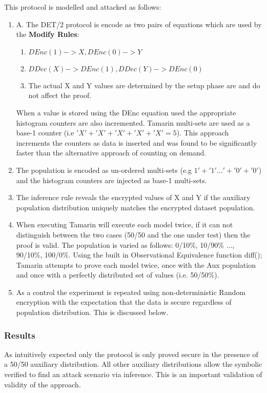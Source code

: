 \documentclass[journal]{IEEEtran}
\begin{document}
This protocol is modelled and attacked as follows:
\begin{enumerate}[label=(\Alph*)]
        \item A. The DET/2 protocol is encode as two pairs of equations which are used by the \textbf{Modify Rules}:
    \begin{enumerate}
        \item 	$DEnc(1) -> X,	DEnc(0) -> Y$
    	\item 	$DDec(X) ->  DEnc(1), DDec(Y) ->  DEnc(0)$
        \item       The actual X and Y values are determined by the setup phase are and do not affect the proof.
    \end{enumerate}
	When a value is stored using the DEnc equation used the appropriate histogram counters are also incremented. Tamarin multi-sets are used as a base-1 counter (i.e $'X'+'X'+'X'+'X'+'X' = 5$).  This approach increments the counters as data is inserted and was found to be significantly faster than the alternative approach of counting on demand.
\item The \aux{} population is encoded as un-ordered multi-sets (e.g $ 1' + '1' ... ' + '0' + '0'$) and the \aux{} histogram counters are injected as base-1 multi-sets.
\item The inference rule reveals the encrypted values of X and Y if the auxiliary population distribution uniquely matches the encrypted dataset population.
\item When executing Tamarin will execute each model twice, if it can not distinguish between the two cases (50/50 and the one under test) then the proof is valid. The population is varied as follows: 0/10\%, 10/90\% ..., 90/10\%, 100/0\%. 
Using the built in Observational Equivalence function diff(); Tamarin attempts to prove each model twice, once with the Aux population and once with a perfectly distributed set of values (i.e. 50/50\%). 
\item As a control the experiment is repeated using non-deterministic Random encryption with the expectation that the data is secure regardless of population distribution. This is discussed below.
\end{enumerate}
\subsubsection{Results} As intuitively expected only the protocol is only proved secure in the presence of a 50/50 auxiliary distribution. All other auxiliary distributions allow the symbolic verified to find an attack scenario via inference. This is an important validation of validity of the approach.
\end{document}
